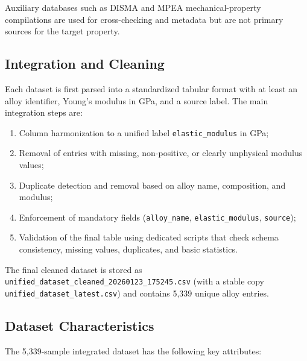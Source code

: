 \documentclass[11pt,a4paper]{article}
\begin{document}
Auxiliary databases such as DISMA and MPEA mechanical-property compilations are used for cross-checking and metadata but are not primary sources for the target property.

\subsection{Integration and Cleaning}

Each dataset is first parsed into a standardized tabular format with at least an alloy identifier, Young's modulus in GPa, and a source label. The main integration steps are:

\begin{enumerate}
  \item Column harmonization to a unified label \texttt{elastic\_modulus} in GPa;
  \item Removal of entries with missing, non-positive, or clearly unphysical modulus values;
  \item Duplicate detection and removal based on alloy name, composition, and modulus;
  \item Enforcement of mandatory fields (\texttt{alloy\_name}, \texttt{elastic\_modulus}, \texttt{source});
  \item Validation of the final table using dedicated scripts that check schema consistency, missing values, duplicates, and basic statistics.
\end{enumerate}

The final cleaned dataset is stored as \texttt{unified\_dataset\_cleaned\_20260123\_175245.csv} (with a stable copy \texttt{unified\_dataset\_latest.csv}) and contains 5{,}339 unique alloy entries.

\subsection{Dataset Characteristics}

The 5{,}339-sample integrated dataset has the following key attributes:
\end{document}
